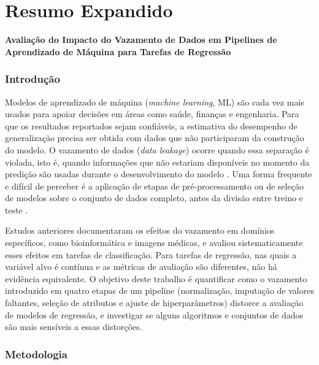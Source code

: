 \chapter{Resumo Expandido}
\label{ap:resumo-expandido}

\begin{otherlanguage}{brazilian}

\begin{center}
\textbf{Avaliação do Impacto do Vazamento de Dados em Pipelines de Aprendizado de Máquina para Tarefas de Regressão}
\end{center}

\subsection*{Introdução}

Modelos de aprendizado de máquina (\emph{machine learning}, ML) são cada vez mais
usados para apoiar decisões em áreas como saúde, finanças e engenharia. Para que
os resultados reportados sejam confiáveis, a estimativa do desempenho de
generalização precisa ser obtida com dados que não participaram da construção do
modelo. O vazamento de dados (\emph{data leakage}) ocorre quando essa separação
é violada, isto é, quando informações que não estariam disponíveis no momento da
predição são usadas durante o desenvolvimento do modelo \cite{kaufman2012}. Uma
forma frequente e difícil de perceber é a aplicação de etapas de
pré-processamento ou de seleção de modelos sobre o conjunto de dados completo,
antes da divisão entre treino e teste \cite{kapoor2023}.

Estudos anteriores documentaram os efeitos do vazamento em domínios específicos,
como bioinformática e imagens médicas, e  avaliou
sistematicamente esses efeitos em tarefas de classificação. Para tarefas de
regressão, nas quais a variável alvo é contínua e as métricas de avaliação são
diferentes, não há evidência equivalente. O objetivo deste trabalho é quantificar
como o vazamento introduzido em quatro etapas de um pipeline (normalização,
imputação de valores faltantes, seleção de atributos e ajuste de
hiperparâmetros) distorce a avaliação de modelos de regressão, e investigar se
alguns algoritmos e conjuntos de dados são mais sensíveis a essas distorções.

\subsection*{Metodologia}


\end{otherlanguage}
